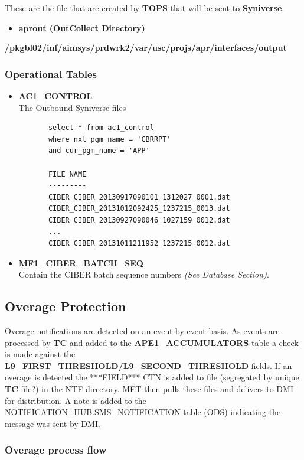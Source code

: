 \documentclass[12pt,twoside]{article}
\begin{document}
   These are the file that are created by \textbf{TOPS} that will be sent to \textbf{Syniverse}.
\begin{itemize}
\item \textbf{aprout (OutCollect Directory)} \\
\end{itemize}
   \textbf{\//pkgbl02\//inf\//aimsys\//prdwrk2\//var\//usc\//projs\//apr\//interfaces\//output}
\subsubsection{Operational Tables}
\label{sec-3-7-2}
\begin{itemize}

\item \textbf{AC1\_CONTROL}\\
\label{sec-3-7-2-1}%
The Outbound Syniverse files
\begin{verbatim}
       select * from ac1_control
       where nxt_pgm_name = 'CBRRPT'
       and cur_pgm_name = 'APP'
      
       FILE_NAME
       ---------
       CIBER_CIBER_20130917090101_1312027_0001.dat
       CIBER_CIBER_20131012092425_1237215_0013.dat
       CIBER_CIBER_20130927090046_1027159_0012.dat
       ...
       CIBER_CIBER_20131011211952_1237215_0012.dat
\end{verbatim}

\item \textbf{MF1\_CIBER\_BATCH\_SEQ}\\
\label{sec-3-7-2-2}%
Contain the CIBER batch sequence numbers \emph{(See Database Section)}.
\end{itemize} %
\subsection{Overage Protection}
\label{sec-3-8}

   Overage notifications are detected on an event by event basis. As events are processed by \textbf{TC} and added to 
   the \textbf{APE1\_ACCUMULATORS} table a check is made against the \textbf{L9\_FIRST\_THRESHOLD/L9\_SECOND\_THRESHOLD} fields. If an overage is detected the ***FIELD*** CTN is added to file (segregated by unique \textbf{TC} file?) in the NTF directory. MFT then pulls these files and delivers to DMI for distribution. A note is added to the NOTIFICATION\_HUB.SMS\_NOTIFICATION table (ODS) indicating the message was sent by DMI.
\subsubsection{Overage process flow}
\label{sec-3-8-1}
\end{document}
